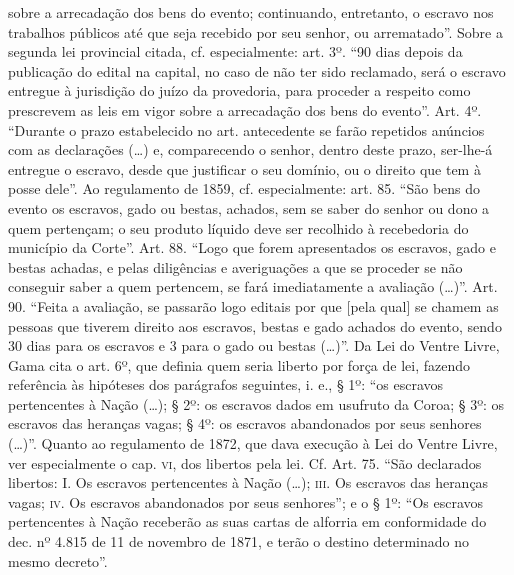 {  sobre a arrecadação dos bens do evento; continuando, entretanto, o
  escravo nos trabalhos públicos até que seja recebido por seu senhor,
  ou arrematado''. Sobre a segunda lei provincial citada, cf.
  especialmente: art. 3º. ``90 dias depois da publicação do edital na
  capital, no caso de não ter sido reclamado, será o escravo entregue à
  jurisdição do juízo da provedoria, para proceder a respeito como
  prescrevem as leis em vigor sobre a arrecadação dos bens do evento''.
  Art. 4º. ``Durante o prazo estabelecido no art. antecedente se farão
  repetidos anúncios com as declarações (\ldots{}) e, comparecendo o senhor,
  dentro deste prazo, ser-lhe-á entregue o escravo, desde que justificar
  o seu domínio, ou o direito que tem à posse dele''. Ao regulamento de
  1859, cf. especialmente: art. 85. ``São bens do evento os escravos,
  gado ou bestas, achados, sem se saber do senhor ou dono a quem
  pertençam; o seu produto líquido deve ser recolhido à recebedoria do
  município da Corte''. Art. 88. ``Logo que forem apresentados os escravos,
  gado e bestas achadas, e pelas diligências e averiguações a que se
  proceder se não conseguir saber a quem pertencem, se fará
  imediatamente a avaliação (\ldots{})''. Art. 90. ``Feita a avaliação, se
  passarão logo editais por que {[}pela qual{]} se chamem as pessoas que
  tiverem direito aos escravos, bestas e gado achados do evento, sendo
  30 dias para os escravos e 3 para o gado ou bestas (\ldots{})''. Da Lei do
  Ventre Livre, Gama cita o art. 6º, que definia quem seria liberto por
  força de lei, fazendo referência às hipóteses dos parágrafos
  seguintes, i. e., § 1º: ``os escravos pertencentes à Nação (\ldots{}); §
  2º: os escravos dados em usufruto da Coroa; § 3º: os escravos das
  heranças vagas; § 4º: os escravos abandonados por seus senhores
  (\ldots{})''. Quanto ao regulamento de 1872, que dava execução à Lei do
  Ventre Livre, ver especialmente o cap. \textsc{vi}, dos libertos pela lei. Cf.
  Art. 75. ``São declarados libertos: I. Os escravos pertencentes à Nação
  (\ldots{}); \textsc{iii}. Os escravos das heranças vagas; \textsc{iv}. Os escravos
  abandonados por seus senhores''; e o § 1º: ``Os escravos pertencentes à
  Nação receberão as suas cartas de alforria em conformidade do dec. nº
  4.815 de 11 de novembro de 1871, e terão o destino determinado no mesmo decreto''.
}
